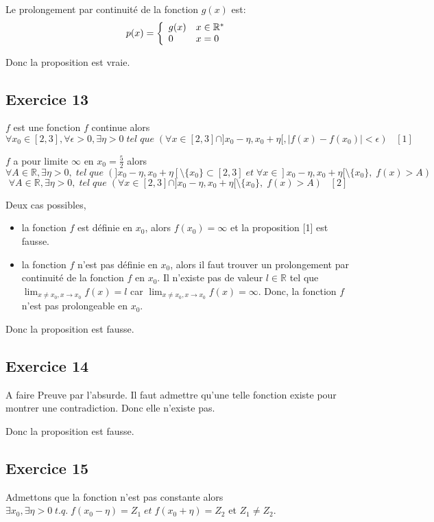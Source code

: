 \documentclass[]{book}
\theoremstyle{definition}
\newcommand{\bb}[1]{\mathbb{#1}}
\newcommand{\R}{\bb{R}}
\begin{document}
Le prolongement par continuit\'e de la fonction $g(x)$ est: 
$$p(x) = 
\left\{ 
\begin{array}{l l}
 g(x) & x \in \R^{*}\\
 0 & x = 0\\
\end{array}
\right. 
$$

Donc la proposition est vraie.


\subsection*{Exercice 13}
$f$ est une fonction $f$ continue alors 
$$\forall x_0 \in [2,3], \forall \epsilon >0, \exists \eta > 0\; tel\; que\; (\forall x \in [2,3] \cap ]x_0-\eta, x_0+\eta[, |f(x)-f(x_0)| < \epsilon) \;\;\; [1]$$ 

$f$ a pour limite $\infty$ en $x_0=\frac{5}{2}$ alors
$$\forall A \in \R, \exists \eta > 0,\; tel\; que\; (]x_0-\eta, x_0+\eta[ \setminus \{x_0\} \subset [2,3] \; et \; \forall x \in ]x_0-\eta, x_0+\eta[ \setminus \{x_0\},\; f(x) > A)$$
$$\forall A \in \R, \exists \eta > 0,\; tel\; que\; (\forall x \in [2,3] \cap ]x_0-\eta, x_0+\eta[ \setminus \{x_0\}, \; f(x) > A) \;\;\; [2]$$

Deux cas possibles, 
\begin{itemize}
\item la fonction $f$ est d\'efinie en $x_0$, alors $f(x_0) = \infty$ et la proposition [1] est fausse.
\item la fonction $f$ n'est pas d\'efinie en $x_0$, alors il faut trouver un prolongement par continuit\'e de la fonction $f$ en $x_0$. Il n'existe pas de valeur $l \in \R$ tel que $\lim_{x \neq x_0, x \to x_0} f(x) = l$ car $\lim_{x \neq x_0, x \to x_0} f(x) = \infty$. Donc,  la fonction $f$ n'est pas prolongeable en $x_0$.
\end{itemize}


Donc la proposition est fausse.


\subsection*{Exercice 14}
A faire
Preuve par l'absurde. Il faut admettre qu'une telle fonction existe pour montrer une contradiction. Donc elle n'existe pas.

Donc la proposition est fausse.

\subsection*{Exercice 15}
Admettons que la fonction n'est pas constante alors $\exists x_0, \exists \eta > 0\; t.q.\; f(x_0 - \eta) = Z_1\; et \; f(x_0 + \eta) = Z_2$ et $Z_1 \neq Z_2$.\\
\end{document}
